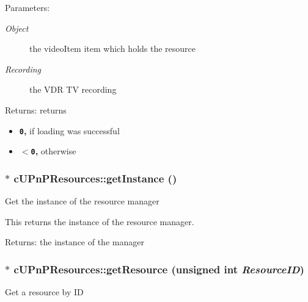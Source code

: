 \begin{Desc}
\item[Parameters:]
\begin{description}
\item[{\em Object}]the videoItem item which holds the resource \item[{\em Recording}]the VDR TV recording \end{description}
\end{Desc}
\begin{Desc}
\item[Returns:]returns\begin{itemize}
\item {\bf {\tt 0},} if loading was successful\item {\bf {\tt $<$0},} otherwise \end{itemize}
\end{Desc}
\hypertarget{classcUPnPResources_c3136b664928d2214e76e0e65a4ace6a}{
\subsubsection[{getInstance}]{ $\ast$ cUPnPResources::getInstance ()}}
\label{classcUPnPResources_c3136b664928d2214e76e0e65a4ace6a}


Get the instance of the resource manager

This returns the instance of the resource manager.

\begin{Desc}
\item[Returns:]the instance of the manager \end{Desc}
\hypertarget{classcUPnPResources_cfec64e65fa14c1efb653c9c4fbbc609}{
\subsubsection[{getResource}]{ $\ast$ cUPnPResources::getResource (unsigned int {\em ResourceID})}}
\label{classcUPnPResources_cfec64e65fa14c1efb653c9c4fbbc609}


Get a resource by ID

